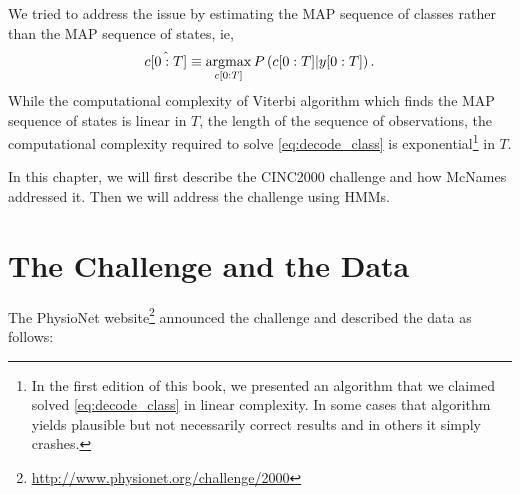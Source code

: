 We tried to address the issue by estimating the MAP sequence of classes
rather than the MAP sequence of states, ie,
\begin{equation}
  \label{eq:decode_class}
  \hat {c[0:T]} \equiv
  \operatorname*{argmax}_{c[0:T]}P\left(c[0:T] | y[0:T]\right).
\end{equation}
While the computational complexity of Viterbi algorithm which finds
the MAP sequence of states is linear in $T$, the length of the
sequence of observations, the computational complexity required to
solve \eqref{eq:decode_class} is exponential\footnote{In the first
  edition of this book, we presented an algorithm that we claimed solved
  \eqref{eq:decode_class} in linear complexity.  In some cases that
  algorithm yields plausible but not necessarily correct results and
  in others it simply crashes.} in $T$.

In this chapter, we will first describe the CINC2000 challenge and how
McNames addressed it.  Then we will address the challenge using HMMs.

\section{The  Challenge and the Data}
\label{sec:challenge}

The PhysioNet
website\footnote{\url{http://www.physionet.org/challenge/2000}}
announced the challenge and described the data as follows:

